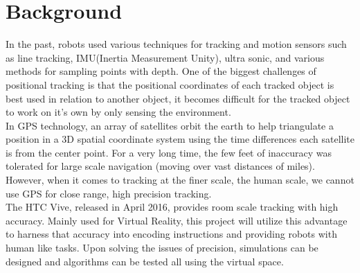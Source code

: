 \documentclass[10pt,a4paper]{article}
\begin{document}
	\section{Background}
	In the past, robots used various techniques for tracking and motion sensors such as line tracking, IMU(Inertia Measurement Unity), ultra sonic, and various methods for sampling points with depth. One of the biggest challenges of positional tracking is that the positional coordinates of each tracked object is best used in relation to another object, it becomes difficult for the tracked object to work on it's own by only sensing the environment.
	\\
	In GPS technology, an array of satellites orbit the earth to help triangulate a position in a 3D spatial coordinate system using the time differences each satellite is from the center point. For a very long time, the few feet of inaccuracy was tolerated for large scale navigation (moving over vast distances of miles). However, when it comes to tracking at the finer scale, the human scale, we cannot use GPS for close range, high precision tracking.
	\\
	The HTC Vive, released in April 2016, provides room scale tracking with high accuracy. Mainly used for Virtual Reality, this project will utilize this advantage to harness that accuracy into encoding instructions and providing robots with human like tasks. Upon solving the issues of precision, simulations can be designed and algorithms can be tested all using the virtual space.
	
\end{document}
